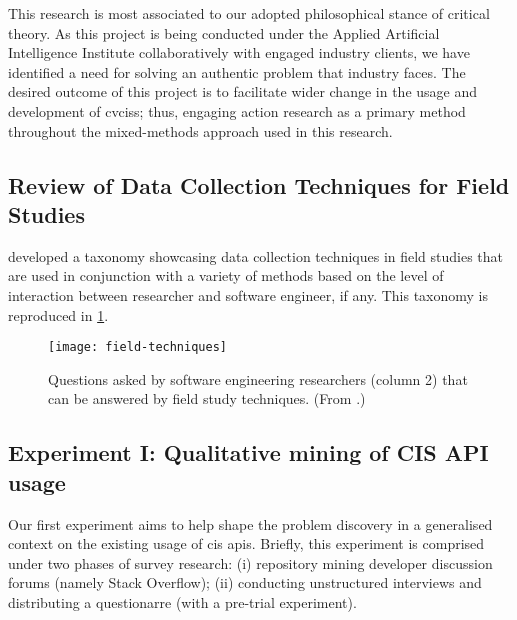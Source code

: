 This research is most associated to our adopted philosophical stance of critical theory. As this project is being conducted under the Applied Artificial Intelligence Institute collaboratively with engaged industry clients, we have identified a need for solving an authentic problem that industry faces. The desired outcome of this project is to facilitate wider change in the usage and development of \glspl{cvcis}; thus, engaging action research as a primary method throughout the mixed-methods approach used in this research.

\subsection{Review of Data Collection Techniques for Field Studies}

\citeauthor{Singer:2007tu} developed a taxonomy \citep{Singer:2007tu,Lethbridge:2005jv} showcasing data collection techniques in field studies that are used in conjunction with a variety of methods based on the level of interaction between researcher and software engineer, if any. This taxonomy is reproduced in \cref{fig:research-strategy:field-techniques}.

\begin{figure}[p!]
\centering
\caption[Review of field study techniques]{Questions asked by software engineering researchers (column 2) that can be answered by field study techniques. (From \citep{Singer:2007tu}.)}
\label{fig:research-strategy:field-techniques}
\texttt{[image: field-techniques]}
\end{figure}


\subsection{Experiment I: Qualitative mining of CIS API usage}

Our first experiment aims to help shape the problem discovery in a generalised context on the existing usage of \gls{cis} \glspl{api}. Briefly, this experiment is comprised under two phases of survey research: (i) repository mining developer discussion forums (namely Stack Overflow); (ii) conducting unstructured interviews and distributing a questionarre (with a pre-trial experiment). 


